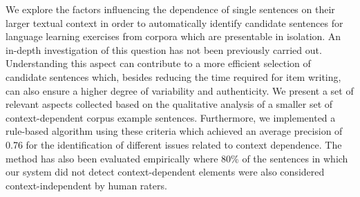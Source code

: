 We explore the factors influencing the dependence of single sentences on their larger textual context in order to automatically identify candidate sentences for language learning exercises from corpora which are presentable in isolation. An in-depth investigation of this question has not been previously carried out. Understanding this aspect can contribute to a more efficient selection of candidate sentences which, besides reducing the time required for item writing, can also ensure a higher degree of variability and authenticity. We present a set of relevant aspects collected based on the qualitative analysis of a smaller set of context-dependent corpus example sentences. Furthermore, we implemented a rule-based algorithm using these criteria which achieved an average precision of 0.76 for the identification of different issues related to context dependence. The method has also been evaluated empirically where 80\% of the sentences in which our system did not detect context-dependent elements were also considered context-independent by human raters.
